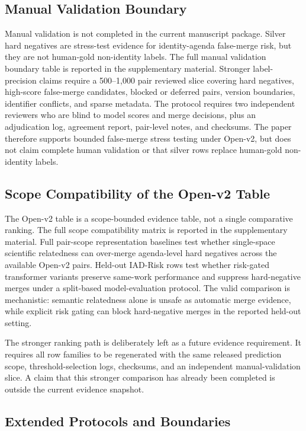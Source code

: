 \documentclass[preprint,12pt]{elsarticle}
\begin{document}
\subsection{Manual Validation Boundary}

Manual validation is not completed in the current manuscript package. Silver hard negatives are stress-test evidence for identity-agenda false-merge risk, but they are not human-gold non-identity labels. The full manual validation boundary table is reported in the supplementary material. Stronger label-precision claims require a 500--1,000 pair reviewed slice covering hard negatives, high-score false-merge candidates, blocked or deferred pairs, version boundaries, identifier conflicts, and sparse metadata. The protocol requires two independent reviewers who are blind to model scores and merge decisions, plus an adjudication log, agreement report, pair-level notes, and checksums. The paper therefore supports bounded false-merge stress testing under Open-v2, but does not claim complete human validation or that silver rows replace human-gold non-identity labels.

\subsection{Scope Compatibility of the Open-v2 Table}

The Open-v2 table is a scope-bounded evidence table, not a single comparative ranking. The full scope compatibility matrix is reported in the supplementary material. Full pair-scope representation baselines test whether single-space scientific relatedness can over-merge agenda-level hard negatives across the available Open-v2 pairs. Held-out IAD-Risk rows test whether risk-gated transformer variants preserve same-work performance and suppress hard-negative merges under a split-based model-evaluation protocol. The valid comparison is mechanistic: semantic relatedness alone is unsafe as automatic merge evidence, while explicit risk gating can block hard-negative merges in the reported held-out setting.

The stronger ranking path is deliberately left as a future evidence requirement. It requires all row families to be regenerated with the same released prediction scope, threshold-selection logs, checksums, and an independent manual-validation slice. A claim that this stronger comparison has already been completed is outside the current evidence snapshot.

\subsection{Extended Protocols and Boundaries}
\end{document}

